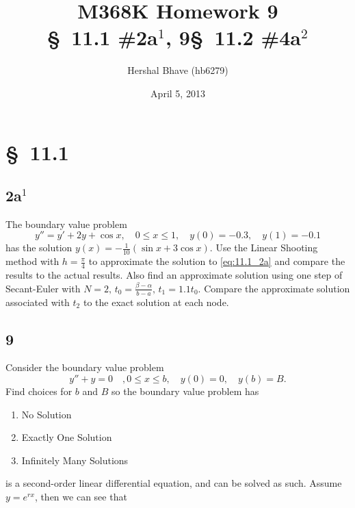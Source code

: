 \documentclass[12pt]{article}
\title{M368K Homework 9 \\
  \normalsize{\S~11.1 \#2a$^1$, 9\quad \S~11.2 \#4a$^2$}}
\author{Hershal Bhave (hb6279)}
\date{April 5, 2013}
\begin{document}
\maketitle

\section{\S~11.1}
\subsection{2a$^1$}
The boundary value problem 
\begin{equation}
  \label{eq:11.1_2a}
  y''=y'+2y+\cos x,\quad 0\leq x \leq 1,\quad y(0)=-0.3,\quad y(1)=-0.1
\end{equation}
has the solution $y(x)=-\frac{1}{10}(\sin x + 3\cos x)$. Use the
Linear Shooting method with $h=\frac{\pi}{4}$ to approximate the
solution to \cref{eq:11.1_2a} and compare the results to the actual
results. Also find an approximate solution using one step of
Secant-Euler with
$N=2,\,t_0=\frac{\beta-\alpha}{b-a},\,t_1=1.1t_0$. Compare the
approximate solution associated with $t_2$ to the exact solution at
each node.

\subsection{9}
Consider the boundary value problem 
\begin{equation}
  \label{eq:11.1_9}
  y''+y=0\quad, 0\leq x\leq b,\quad y(0)=0,\quad y(b)=B.
\end{equation}
Find choices for $b$ and $B$ so the boundary value problem has
\begin{enumerate}
\item No Solution
\item Exactly One Solution
\item Infinitely Many Solutions
\end{enumerate}

 is a second-order linear differential equation,
and can be solved as such. Assume $y=e^{rx}$, then we can see that
\end{document}
